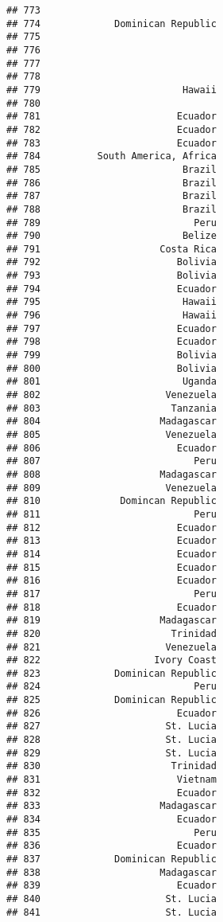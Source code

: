 \documentclass[
]{article}
\begin{document}
\begin{verbatim}
## 773                               
## 774             Dominican Republic
## 775                               
## 776                               
## 777                               
## 778                               
## 779                         Hawaii
## 780                               
## 781                        Ecuador
## 782                        Ecuador
## 783                        Ecuador
## 784          South America, Africa
## 785                         Brazil
## 786                         Brazil
## 787                         Brazil
## 788                         Brazil
## 789                           Peru
## 790                         Belize
## 791                     Costa Rica
## 792                        Bolivia
## 793                        Bolivia
## 794                        Ecuador
## 795                         Hawaii
## 796                         Hawaii
## 797                        Ecuador
## 798                        Ecuador
## 799                        Bolivia
## 800                        Bolivia
## 801                         Uganda
## 802                      Venezuela
## 803                       Tanzania
## 804                     Madagascar
## 805                      Venezuela
## 806                        Ecuador
## 807                           Peru
## 808                     Madagascar
## 809                      Venezuela
## 810              Domincan Republic
## 811                           Peru
## 812                        Ecuador
## 813                        Ecuador
## 814                        Ecuador
## 815                        Ecuador
## 816                        Ecuador
## 817                           Peru
## 818                        Ecuador
## 819                     Madagascar
## 820                       Trinidad
## 821                      Venezuela
## 822                    Ivory Coast
## 823             Dominican Republic
## 824                           Peru
## 825             Dominican Republic
## 826                        Ecuador
## 827                      St. Lucia
## 828                      St. Lucia
## 829                      St. Lucia
## 830                       Trinidad
## 831                        Vietnam
## 832                        Ecuador
## 833                     Madagascar
## 834                        Ecuador
## 835                           Peru
## 836                        Ecuador
## 837             Dominican Republic
## 838                     Madagascar
## 839                        Ecuador
## 840                      St. Lucia
## 841                      St. Lucia

\end{verbatim}
\end{document}
